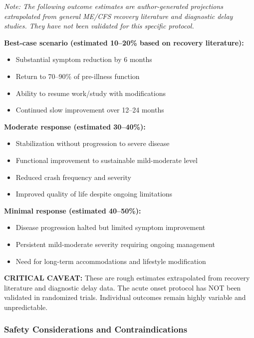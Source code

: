 \begin{recommendation}
\label{rec:acute-onset-outcomes}

\textit{Note: The following outcome estimates are author-generated projections extrapolated from general ME/CFS recovery literature and diagnostic delay studies. They have not been validated for this specific protocol.}

\textbf{Best-case scenario (estimated 10--20\% based on recovery literature):}
\begin{itemize}
    \item Substantial symptom reduction by 6 months
    \item Return to 70--90\% of pre-illness function
    \item Ability to resume work/study with modifications
    \item Continued slow improvement over 12--24 months
\end{itemize}

\textbf{Moderate response (estimated 30--40\%):}
\begin{itemize}
    \item Stabilization without progression to severe disease
    \item Functional improvement to sustainable mild-moderate level
    \item Reduced crash frequency and severity
    \item Improved quality of life despite ongoing limitations
\end{itemize}

\textbf{Minimal response (estimated 40--50\%):}
\begin{itemize}
    \item Disease progression halted but limited symptom improvement
    \item Persistent mild-moderate severity requiring ongoing management
    \item Need for long-term accommodations and lifestyle modification
\end{itemize}

\textbf{CRITICAL CAVEAT:} These are rough estimates extrapolated from recovery literature and diagnostic delay data. The acute onset protocol has NOT been validated in randomized trials. Individual outcomes remain highly variable and unpredictable.
\end{recommendation}

\subsubsection{Safety Considerations and Contraindications}

